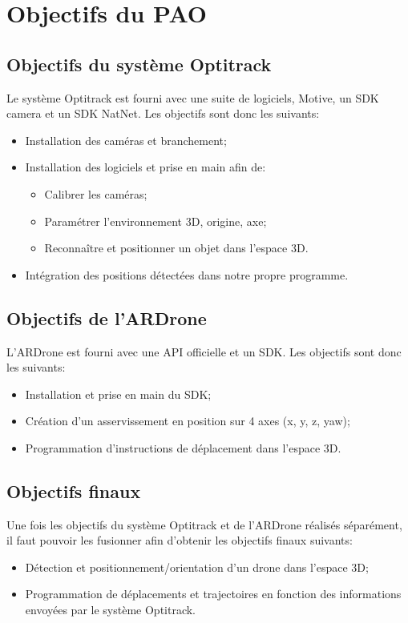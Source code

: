 \chapter{Objectifs du PAO}
	\section{Objectifs du système Optitrack}
		Le système Optitrack est fourni avec une suite de logiciels, Motive, un SDK camera et un SDK NatNet. Les objectifs sont donc les suivants: \\
		\begin{itemize}
			\item Installation des caméras et branchement;
			\item Installation des logiciels et prise en main afin de:
			\begin{itemize}
				\item Calibrer les caméras;
				\item Paramétrer l'environnement 3D, origine, axe;
				\item Reconnaître et positionner un objet dans l'espace 3D\@.
			\end{itemize}
			\item Intégration des positions détectées dans notre propre programme.
		\end{itemize}


	\section{Objectifs de l'ARDrone}
		L'ARDrone est fourni avec une API officielle et un SDK\@. Les objectifs sont donc les suivants: \\
		\begin{itemize}
			\item Installation et prise en main du SDK\@;
			\item Création d'un asservissement en position sur 4 axes (x, y, z, yaw);
			\item Programmation d'instructions de déplacement dans l'espace 3D\@.
		\end{itemize}


	\section{Objectifs finaux}
		Une fois les objectifs du système Optitrack et de l'ARDrone réalisés séparément, il faut pouvoir les fusionner afin d'obtenir les objectifs finaux suivants: \\
		\begin{itemize}
			\item Détection et positionnement/orientation d'un drone dans l'espace 3D\@;
			\item Programmation de déplacements et trajectoires en fonction des informations envoyées par le système Optitrack.
		\end{itemize}

